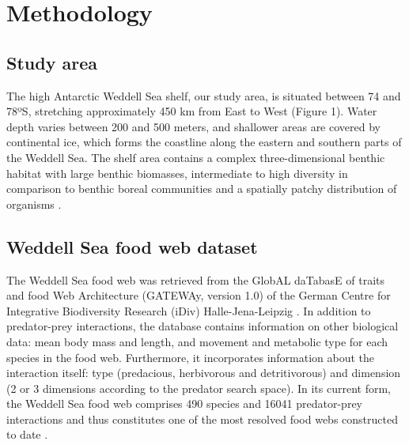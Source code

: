\documentclass[gc, manuscript]{copernicus}
\begin{document}
\section{Methodology}

\subsection{Study area}

The high Antarctic Weddell Sea shelf, our study area, is situated
between 74 and 78ºS, stretching approximately 450 km from East to West
(Figure 1). Water depth varies between 200 and 500 meters, and shallower
areas are covered by continental ice, which forms the coastline along
the eastern and southern parts of the Weddell Sea. The shelf area
contains a complex three-dimensional benthic habitat with large benthic
biomasses, intermediate to high diversity in comparison to benthic
boreal communities and a spatially patchy distribution of organisms
\citep{Dayton1990, Teixido2002}.

\subsection{Weddell Sea food web dataset}

The Weddell Sea food web was retrieved from the GlobAL daTabasE of
traits and food Web Architecture (GATEWAy, version 1.0) of the German
Centre for Integrative Biodiversity Research (iDiv) Halle-Jena-Leipzig
\citep{Brose2018}. In addition to predator-prey interactions, the
database contains information on other biological data: mean body mass
and length, and movement and metabolic type for each species in the food
web. Furthermore, it incorporates information about the interaction
itself: type (predacious, herbivorous and detritivorous) and dimension
(2 or 3 dimensions according to the predator search space). In its
current form, the Weddell Sea food web comprises 490 species and 16041
predator-prey interactions and thus constitutes one of the most resolved
food webs constructed to date \citep{Jacob2011}.
\end{document}
